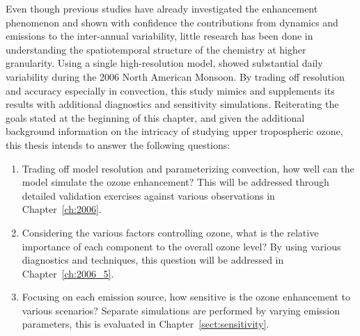 Even though previous studies have already investigated the enhancement phenomenon and shown
with confidence the contributions from dynamics and emissions to the inter-annual variability, little
research has been done in understanding the spatiotemporal structure of the chemistry at higher granularity.
Using a single high-resolution model, \citet{Barth:2012qf} showed substantial daily variability during the
2006 North American Monsoon. By trading off resolution and accuracy especially in convection, this
study mimics \citet{Barth:2012qf} and supplements its results with additional diagnostics and sensitivity
simulations. Reiterating the goals stated at the beginning of this chapter, and given the additional
background information on the intricacy of studying upper tropospheric ozone, this thesis intends to
answer the following questions:
\begin{enumerate}
\item{} Trading off model resolution and parameterizing convection, how well can the model simulate the
ozone enhancement? This will be addressed through detailed validation exercises against various
observations in Chapter~\ref{ch:2006}.
\item{} Considering the various factors controlling ozone, what is the relative importance of each component
to the overall ozone level? By using various diagnostics and techniques, this question will be addressed
in Chapter~\ref{ch:2006_5}.
\item{} Focusing on each emission source, how sensitive is the ozone enhancement to various scenarios?
Separate simulations are performed by varying emission parameters, this is evaluated in Chapter~\ref{sect:sensitivity}.
\end{enumerate}

